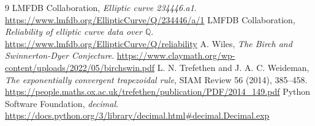 \documentclass[11pt]{article}
\begin{document}
\endgroup
\raggedright
\begin{thebibliography}{9}
 LMFDB Collaboration, \emph{Elliptic curve 234446.a1}.
\url{https://www.lmfdb.org/EllipticCurve/Q/234446/a/1}
 LMFDB Collaboration,
\emph{Reliability of elliptic curve data over \(\mathbb Q\)}.
\url{https://www.lmfdb.org/EllipticCurve/Q/reliability}
 A. Wiles, \emph{The Birch and Swinnerton-Dyer Conjecture}.
\url{https://www.claymath.org/wp-content/uploads/2022/05/birchswin.pdf}
 L. N. Trefethen and J. A. C. Weideman,
\emph{The exponentially convergent trapezoidal rule},
SIAM Review 56 (2014), 385--458.
\url{https://people.maths.ox.ac.uk/trefethen/publication/PDF/2014_149.pdf}
 Python Software Foundation, \emph{decimal}.
\url{https://docs.python.org/3/library/decimal.html#decimal.Decimal.exp}
\end{thebibliography}
\end{document}
